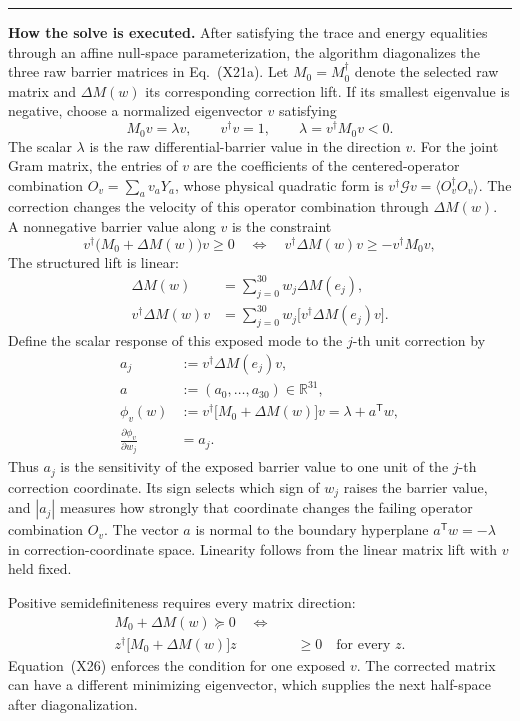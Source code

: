 \documentclass[10pt,letterpaper,twocolumn]{article}
\newcommand{\R}{\mathbb R}
\newcommand{\conceptbreak}{%
  \par\medskip\noindent
  {\color{black!30}\rule{\columnwidth}{0.35pt}}%
  \par\medskip
}
\begin{document}
\conceptbreak
\textbf{How the solve is executed.}
After satisfying the trace and energy equalities through an affine null-space
parameterization, the algorithm diagonalizes the three raw barrier matrices in
Eq.~(X21a).  Let \(M_0=M_0^\dagger\) denote the selected raw matrix and
\(\Delta M(w)\) its corresponding correction lift.  If its smallest
eigenvalue is negative, choose a normalized eigenvector \(v\) satisfying
\[
M_0v=\lambda v,
\qquad
v^\dagger v=1,
\qquad
\lambda=v^\dagger M_0v<0.
\tag{X25a}
\]
The scalar \(\lambda\) is the raw differential-barrier value in the direction
\(v\).  For the joint Gram matrix, the entries of \(v\) are the coefficients
of the centered-operator combination
\(O_v=\sum_a v_aY_a\), whose physical quadratic form is
\(v^\dagger\mathcal Gv=\langle O_v^\dagger O_v\rangle\).
The correction changes the velocity of this operator combination through
\(\Delta M(w)\).  A nonnegative barrier value
along \(v\) is the constraint
\[
v^\dagger\bigl(M_0+\Delta M(w)\bigr)v\geq0
\quad\Longleftrightarrow\quad
v^\dagger\Delta M(w)v\geq-v^\dagger M_0v,
\tag{X26}
\]
The structured lift is linear:
\[
\begin{aligned}
\Delta M(w)
&=\sum_{j=0}^{30}w_j\Delta M(e_j),\\
v^\dagger\Delta M(w)v
&=\sum_{j=0}^{30}w_j
\bigl[v^\dagger\Delta M(e_j)v\bigr].
\end{aligned}
\tag{X26a}
\]
Define the scalar response of this exposed mode to the \(j\)-th unit
correction by
\[
\begin{aligned}
a_j&:=v^\dagger\Delta M(e_j)v,\\
a&:=(a_0,\ldots,a_{30})\in\R^{31},\\
\phi_v(w)
&:=v^\dagger\bigl[M_0+\Delta M(w)\bigr]v
=\lambda+a^{\mathsf T}w,\\
\frac{\partial\phi_v}{\partial w_j}&=a_j.
\end{aligned}
\tag{X26b}
\]
Thus \(a_j\) is the sensitivity of the exposed barrier value to one unit of
the \(j\)-th correction coordinate.  Its sign selects which sign of \(w_j\)
raises the barrier value, and \(|a_j|\) measures how strongly that coordinate
changes the failing operator combination \(O_v\).  The vector \(a\) is normal
to the boundary hyperplane \(a^{\mathsf T}w=-\lambda\) in correction-coordinate
space.  Linearity follows from the linear matrix lift with \(v\) held fixed.

Positive semidefiniteness requires every matrix direction:
\[
\begin{aligned}
M_0+\Delta M(w)\succeq0
\quad\Longleftrightarrow\quad&\\[-0.8ex]
z^\dagger\bigl[M_0+\Delta M(w)\bigr]z&\geq0
\quad\text{for every }z.
\end{aligned}
\tag{X26c}
\]
Equation~(X26) enforces the condition for one exposed \(v\).  The corrected
matrix can have a different minimizing eigenvector, which supplies the next
half-space after diagonalization.
\end{document}
